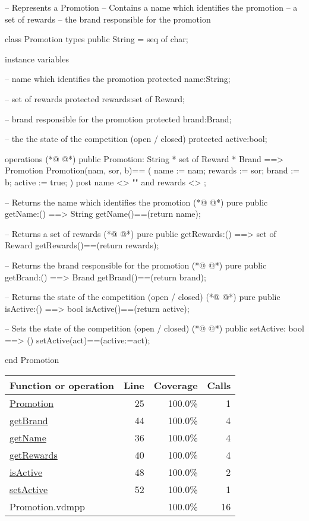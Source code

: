 \begin{vdmpp}[breaklines=true]
-- Represents a Promotion
-- Contains a name which identifies the promotion
--      a set of rewards
--          the brand responsible for the promotion

class Promotion
 types
    public String = seq of char;

 instance variables
 
  -- name which identifies the promotion
  protected name:String; 
  
  -- set of rewards
   protected rewards:set of Reward;
   
   -- brand responsible for the promotion
   protected brand:Brand;
   
   -- the the state of the competition (open / closed)
  protected active:bool;

 operations
(*@
\label{Promotion:25}
@*)
  public Promotion: String * set of Reward * Brand ==> Promotion
  Promotion(nam, sor, b)== 
  (
    name := nam;
    rewards := sor;
    brand := b;
    active := true;
  )
  post name <> "" and rewards <> {};
  
  -- Returns the name which identifies the promotion
(*@
\label{getName:36}
@*)
  pure public getName:() ==> String
     getName()==(return name);
     
   -- Returns a set of rewards 
(*@
\label{getRewards:40}
@*)
   pure public getRewards:() ==> set of Reward
    getRewards()==(return rewards);
  
  -- Returns the brand responsible for the promotion 
(*@
\label{getBrand:44}
@*)
   pure public getBrand:() ==> Brand
    getBrand()==(return brand); 
     
  -- Returns the state of the competition (open / closed)
(*@
\label{isActive:48}
@*)
  pure public isActive:() ==> bool
    isActive()==(return active);
    
   -- Sets the state of the competition (open / closed)
(*@
\label{setActive:52}
@*)
   public setActive: bool ==> ()
   setActive(act)==(active:=act);

end Promotion
\end{vdmpp}
\bigskip
\begin{longtable}{|l|r|r|r|}
\hline
Function or operation & Line & Coverage & Calls \\
\hline
\hline
\hyperref[Promotion:25]{Promotion} & 25&100.0\% & 1 \\
\hline
\hyperref[getBrand:44]{getBrand} & 44&100.0\% & 4 \\
\hline
\hyperref[getName:36]{getName} & 36&100.0\% & 4 \\
\hline
\hyperref[getRewards:40]{getRewards} & 40&100.0\% & 4 \\
\hline
\hyperref[isActive:48]{isActive} & 48&100.0\% & 2 \\
\hline
\hyperref[setActive:52]{setActive} & 52&100.0\% & 1 \\
\hline
\hline
Promotion.vdmpp & & 100.0\% & 16 \\
\hline
\end{longtable}

